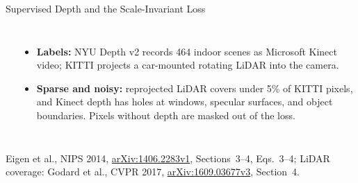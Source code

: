 \begin{frame}{Supervised Depth and the Scale-Invariant Loss}
\begin{columns}[T,onlytextwidth]
\begin{tcolorbox}[colframe=KAred, colback=gray!6, boxrule=0.5pt, left=4pt, right=4pt, top=3pt, bottom=3pt]
      \end{tcolorbox}
      \begin{itemize}\footnotesize\itemsep0.3em
        \item \textbf{Labels:} NYU Depth v2 records 464 indoor scenes as Microsoft Kinect video; KITTI projects a car-mounted rotating LiDAR into the camera.
        \item \textbf{Sparse and noisy:} reprojected LiDAR covers under 5\% of KITTI pixels, and Kinect depth has holes at windows, specular surfaces, and object boundaries. Pixels without depth are masked out of the loss.
      \end{itemize}
  \end{columns}
  \vspace{0.2em}
  {\scriptsize Eigen et al., NIPS 2014, \href{https://arxiv.org/abs/1406.2283v1}{arXiv:1406.2283v1}, Sections~3--4, Eqs.~3--4; LiDAR coverage: Godard et al., CVPR 2017, \href{https://arxiv.org/abs/1609.03677v3}{arXiv:1609.03677v3}, Section~4.\par}
\end{frame}


